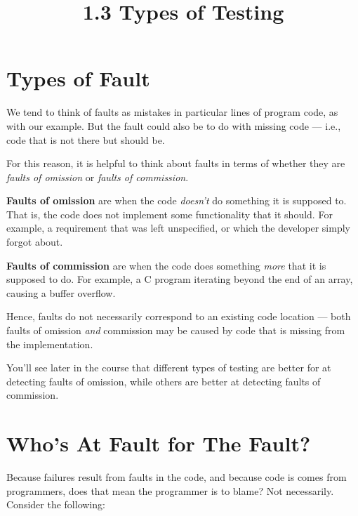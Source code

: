 



\title{1.3 Types of Testing}

\section{Types of Fault}


We tend to think of faults as mistakes in particular lines of program code, as
with our example. But the fault could also be to do with missing code --- i.e.,
code that is not there but should be. 

For this reason, it is helpful to think about faults in terms of whether they
are {\it faults of omission} or {\it faults of commission}. 


{\bf Faults of omission} are when the code {\it doesn't} do something it is
supposed to. That is, the code does not implement some functionality that it
should. For example, a requirement that was left unspecified, or which the
developer simply forgot about. 

{\bf Faults of commission} are when the code does something {\it more} that it
is supposed to do. For example, a C program iterating beyond the end of an
array, causing a buffer overflow. 

Hence, faults do not necessarily correspond to an existing code location ---
both faults of omission {\it and} commission may be caused by code that is
missing from the implementation. 

You'll see later in the course that different types of testing are better for at
detecting faults of omission, while others are better at detecting faults of
commission. 


\section{Who's At Fault for The Fault?}


Because failures result from faults in the code, and because code is comes from
programmers, does that mean the programmer is to blame? Not necessarily.
Consider the following:

